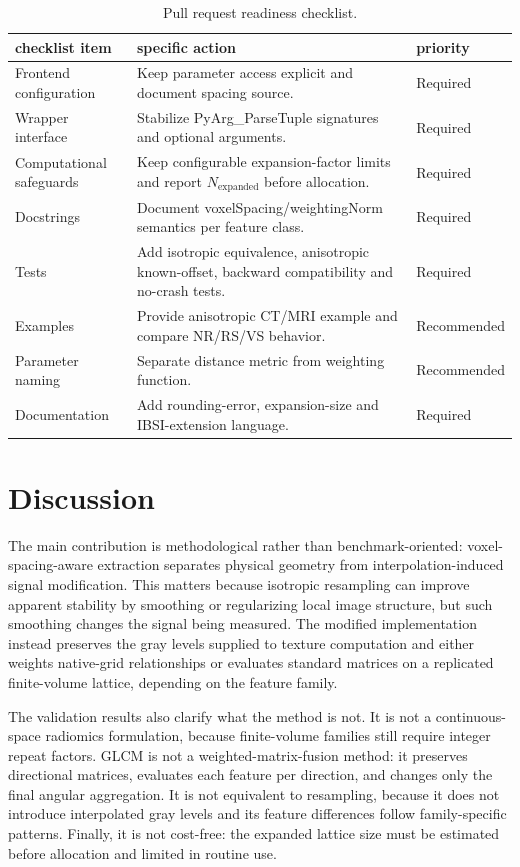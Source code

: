 \documentclass[11pt]{article}
\begin{document}
\begin{table}[t]
\centering
\small
\begin{tabular}{p{}p{}p{}}
\toprule
checklist item & specific action & priority \\
\midrule
Frontend configuration & Keep parameter access explicit and document spacing source. & Required \\
Wrapper interface & Stabilize PyArg\_ParseTuple signatures and optional arguments. & Required \\
Computational safeguards & Keep configurable expansion-factor limits and report \(N_{\mathrm{expanded}}\) before allocation. & Required \\
Docstrings & Document voxelSpacing/weightingNorm semantics per feature class. & Required \\
Tests & Add isotropic equivalence, anisotropic known-offset, backward compatibility and no-crash tests. & Required \\
Examples & Provide anisotropic CT/MRI example and compare NR/RS/VS behavior. & Recommended \\
Parameter naming & Separate distance metric from weighting function. & Recommended \\
Documentation & Add rounding-error, expansion-size and IBSI-extension language. & Required \\
\bottomrule
\end{tabular}
\caption{Pull request readiness checklist.}
\label{tab:pr-checklist}
\end{table}

\section{Discussion}
The main contribution is methodological rather than benchmark-oriented: voxel-spacing-aware extraction separates physical geometry from interpolation-induced signal modification. This matters because isotropic resampling can improve apparent stability by smoothing or regularizing local image structure, but such smoothing changes the signal being measured. The modified implementation instead preserves the gray levels supplied to texture computation and either weights native-grid relationships or evaluates standard matrices on a replicated finite-volume lattice, depending on the feature family.

The validation results also clarify what the method is not. It is not a continuous-space radiomics formulation, because finite-volume families still require integer repeat factors. GLCM is not a weighted-matrix-fusion method: it preserves directional matrices, evaluates each feature per direction, and changes only the final angular aggregation. It is not equivalent to resampling, because it does not introduce interpolated gray levels and its feature differences follow family-specific patterns. Finally, it is not cost-free: the expanded lattice size must be estimated before allocation and limited in routine use.
\end{document}
